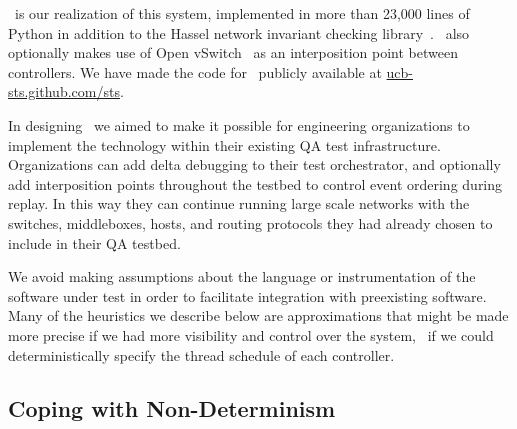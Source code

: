 
\projectname~is our realization of this system, implemented in more than 23,000 lines of Python in
addition to the Hassel network invariant checking library~\cite{hsa}.
\projectname~also optionally makes use of Open vSwitch~\cite{pfaff2009extending} as an interposition point
between controllers. We have
made the code for \projectname~publicly available at \href{http://ucb-sts.github.com/sts}{ucb-sts.github.com/sts}.

 In designing \projectname~we aimed to make
it possible for engineering organizations to
implement the technology within their existing QA test infrastructure.
Organizations can add delta debugging to their test
orchestrator, and optionally add interposition points throughout the
testbed to control event ordering during replay.
In this way they can continue running large scale networks with
the switches, middleboxes, hosts, and routing protocols they had already
chosen to include in their QA testbed.

We avoid making assumptions about the language or instrumentation of the
software under test in order to facilitate integration with preexisting software. Many of the heuristics we describe below are
approximations that might be made more precise if we had more visibility and
control over the system, \eg~if we could deterministically specify the thread schedule of each
controller.


\subsection{Coping with Non-Determinism}
\label{subsec:coping}

